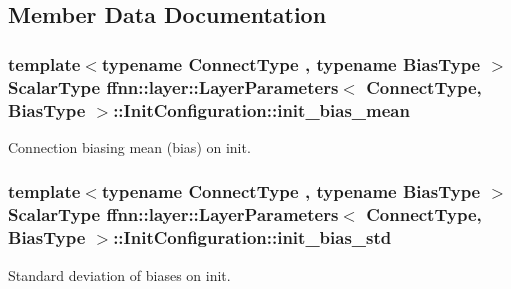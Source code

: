 \subsection{Member Data Documentation}
\hypertarget{structffnn_1_1layer_1_1_layer_parameters_1_1_init_configuration_aed70a26d27b82dabc6bd427e2e3cbc40}{
\subsubsection[{init\-\_\-bias\-\_\-mean}]{\setlength{\rightskip}{0pt plus 5cm}template$<$typename Connect\-Type , typename Bias\-Type $>$ {\bf Scalar\-Type} {\bf ffnn\-::layer\-::\-Layer\-Parameters}$<$ Connect\-Type, Bias\-Type $>$\-::Init\-Configuration\-::init\-\_\-bias\-\_\-mean}}\label{structffnn_1_1layer_1_1_layer_parameters_1_1_init_configuration_aed70a26d27b82dabc6bd427e2e3cbc40}


Connection biasing mean (bias) on init. 

\hypertarget{structffnn_1_1layer_1_1_layer_parameters_1_1_init_configuration_a1b25823d71be5fe04f8fb392fc287c3f}{
\subsubsection[{init\-\_\-bias\-\_\-std}]{\setlength{\rightskip}{0pt plus 5cm}template$<$typename Connect\-Type , typename Bias\-Type $>$ {\bf Scalar\-Type} {\bf ffnn\-::layer\-::\-Layer\-Parameters}$<$ Connect\-Type, Bias\-Type $>$\-::Init\-Configuration\-::init\-\_\-bias\-\_\-std}}\label{structffnn_1_1layer_1_1_layer_parameters_1_1_init_configuration_a1b25823d71be5fe04f8fb392fc287c3f}


Standard deviation of biases on init. 

